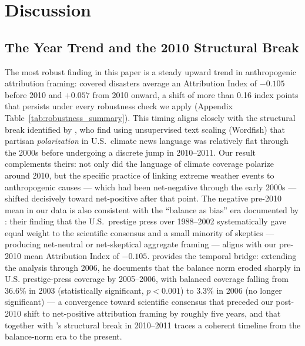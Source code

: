 \documentclass[12pt]{article}
\begin{document}
\section{Discussion}

\subsection*{The Year Trend and the 2010 Structural Break}

The most robust finding in this paper is a steady upward trend in
anthropogenic attribution framing: covered disasters average an
Attribution Index of $-0.105$ before 2010 and $+0.057$ from 2010
onward, a shift of more than 0.16 index points that persists under
every robustness check we apply (Appendix
Table~\ref{tab:robustness_summary}).
This timing aligns closely with the structural break identified by
\citet{chinn2020}, who find using unsupervised text scaling (Wordfish)
that partisan \emph{polarization} in U.S.\ climate news language was
relatively flat through the 2000s before undergoing a discrete jump in
2010--2011.  Our result complements theirs: not only did the language
of climate coverage polarize around 2010, but the specific practice of
linking extreme weather events to anthropogenic causes --- which had
been net-negative through the early 2000s --- shifted decisively toward
net-positive after that point.  The negative pre-2010 mean in our data
is also consistent with the ``balance as bias'' era documented by
\citet{boykoff2004}: their finding that the U.S.\ prestige press over
1988--2002 systematically gave equal weight to the scientific consensus
and a small minority of skeptics --- producing net-neutral or
net-skeptical aggregate framing --- aligns with our pre-2010 mean
Attribution Index of $-0.105$.  \citet{boykoff2007} provides the
temporal bridge: extending the analysis through 2006, he documents that
the balance norm eroded sharply in U.S. prestige-press coverage by
2005--2006, with balanced coverage falling from 36.6\% in 2003
(statistically significant, $p<0.001$) to 3.3\% in 2006 (no longer
significant) --- a convergence toward scientific consensus that preceded
our post-2010 shift to net-positive attribution framing by roughly
five years, and that together with \citet{chinn2020}'s structural break
in 2010--2011 traces a coherent timeline from the balance-norm era to
the present.
\end{document}
